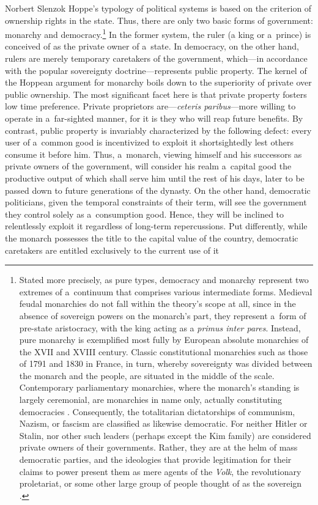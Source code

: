\begin{artengenv}{Norbert Slenzok}
Hoppe's typology of political systems is based on the criterion of ownership rights in the state. Thus, there are only two basic forms of government: monarchy and democracy.\footnote{Stated more precisely, as pure types, democracy and monarchy represent two extremes of a~continuum that comprises various intermediate forms. Medieval feudal monarchies do not fall within the theory's scope at all, since in the absence of sovereign powers on the monarch's part, they represent a~form of pre-state aristocracy, with the king acting as a \textit{primus inter pares}. Instead, pure monarchy is exemplified most fully by European absolute monarchies of the XVII and XVIII century. Classic constitutional monarchies such as those of 1791 and 1830 in France, in turn, whereby sovereignty was divided between the monarch and the people, are situated in the middle of the scale. Contemporary parliamentary monarchies, where the monarch's standing is largely ceremonial, are monarchies in name only, actually constituting democracies 
\parencites[][f.19]{hoppe_democracy_2007}[][pp.108–112]{hoppe_short_2015}. %
 Consequently, the totalitarian dictatorships of communism, Nazism, or fascism are classified as likewise democratic. For neither Hitler or Stalin, nor other such leaders (perhaps except the Kim family) are considered private owners of their governments. Rather, they are at the helm of mass democratic parties, and the ideologies that provide legitimation for their claims to power present them as mere agents of the \textit{Volk}, the revolutionary proletariat, or some other large group of people thought of as the sovereign 
\parencite[][p.179]{hoppe_eigentum_1987}. %
 } In the former system, the ruler (a king or a~prince) is conceived of as the private owner of a~state. In democracy, on the other hand, rulers are merely temporary caretakers of the government, which---in accordance with the popular sovereignty doctrine---represents public property. The kernel of the Hoppean argument for monarchy boils down to the superiority of private over public ownership. The most significant facet here is that private property fosters low time preference. Private proprietors are---\textit{ceteris paribus}---more willing to operate in a~far-sighted manner, for it is they who will reap future benefits. By contrast, public property is invariably characterized by the following defect: every user of a~common good is incentivized to exploit it shortsightedly lest others consume it before him. Thus, a~monarch, viewing himself and his successors as private owners of the government, will consider his realm a~capital good the productive output of which shall serve him until the rest of his days, later to be passed down to future generations of the dynasty. On the other hand, democratic politicians, given the temporal constraints of their term, will see the government they control solely as a~consumption good. Hence, they will be inclined to relentlessly exploit it regardless of long-term repercussions. Put differently, while the monarch possesses the title to the capital value of the country, democratic caretakers are entitled exclusively to the current use of it 

\end{artengenv}
